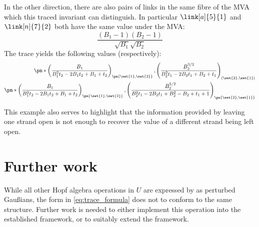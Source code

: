 In the other direction, there are also pairs of links in the same fibre of the
\ac{MVA} which this traced invariant can distinguish. In particular
$\link[a]{5}{1}$ and $\link[n]{7}{2}$ both have the same value under the
\ac{MVA}:
\begin{equation}
        \frac{\left(B_1-1\right) \left(B_2-1\right)}{\sqrt{B_1} \sqrt{B_2}}
\end{equation}
The trace yields the following values (respectively):
\begin{align}
\pn*{
                \left(
                        \frac{B_1}{B_1^2 t_2  -2 B_1 t_2  +B_1+t_2 
                }\right)_{\pn{\set{1},\set{2}}}
                ,\left(\frac{B_2^{3/2}}{B_2^2 t_1  -2 B_2 t_1  +B_2+t_1 
        }\right)_{(\set{2},\set{1})}
}\\
        \pn*{
          \left(\frac{B_1}{B_1^2 t_2  -2 B_1 t_2  +B_1+t_2 
        }\right)_{\pn{\set{1},\set{2}}},\left(\frac{B_2^{5/2}}{B_2^2 t_1  -2 B_2 t_1  +B_2^2-B_2+t_1  +1}\right)_{\pn{\set{2},\set{1}}}} 
\end{align}

This example also serves to highlight that the information provided by leaving
one strand open is not enough to recover the value of a different strand being
left open.

\section{Further work}
While all other Hopf algebra operations in $U$ are expressed by \cite{BV} as
perturbed Gaußians, the form in \cref{eq:trace_formula} does not to conform to
the same structure. Further work is needed to either implement this operation
into the established framework, or to suitably extend the framework.
